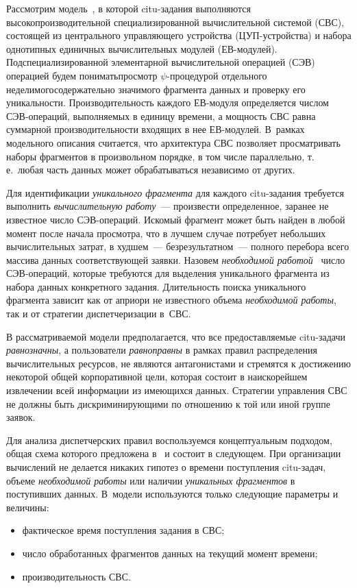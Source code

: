 \begin{multicols}{2}
Рассмотрим модель~\cite{Inf1-13}, в которой citu-за\-да\-ния выполняются
высокопроизводительной специализированной вы\-чис\-ли\-тель\-ной сис\-те\-мой
(СВС),  со\-сто\-ящей из центрального управляющего устрой\-ст\-ва
(ЦУП-устрой\-ст\-ва) и набора однотипных  единичных вычислительных
модулей (ЕВ-модулей). Под\linebreak специализированной элементарной
вычислительной операцией (СЭВ) опе\-ра\-ци\-ей будем понимать\linebreak просмотр
$\psi$-про\-це\-ду\-рой отдельного неделимого\linebreak содержательно значимого
фрагмента данных и проверку  его уникальности.  Производительность
каж\-до\-го ЕВ-мо\-ду\-ля  определяется числом СЭВ-опе\-ра\-ций, выполняемых в
единицу времени, а мощ\-ность СВС равна суммарной производительности
входящих в нее ЕВ-мо\-ду\-лей. В~рамках модельного описания считается,
что архитектура СВС позволяет просматривать наборы фрагментов в
произвольном порядке, в том числе параллельно, т.\,е.\ любая часть
данных может обрабатываться независимо от других.

Для идентификации \textit{уникального фрагмента} для каждого
citu-за\-да\-ния требуется выполнить  \textit{вычислительную работу}~---
произвести определенное, заранее не известное число СЭВ-опе\-ра\-ций.
Искомый фрагмент может быть найден в любой момент после начала
просмотра, что в лучшем случае потребует небольших вычислительных
затрат, в худшем~--- безрезультатном~---  полного перебора всего
массива данных соответствующей заявки. Назовем \textit{необходимой
работой}~\cite{Prep1-13} число СЭВ-опе\-ра\-ций, которые требуются  для
выделения уникального фрагмента из набора данных конкретного
задания. Длительность  поиска уникального фрагмента зависит как от
априори не известного объема \textit{необходимой работы}, так и  от
стратегии  диспетчеризации в~СВС.

В рассматриваемой модели предполагается, что все предоставляемые
citu-за\-да\-чи \textit{равнозначны}, а пользователи
\textit{равноправны} в рамках правил распределения вычислительных
ресурсов, не являются антагонистами и стремятся к достижению
некоторой общей корпоративной цели, которая состоит в  наискорейшем
извлечении всей информации из имеющихся данных. Стратегии управления
СВС не должны быть дискриминирующими по отношению к той или иной
группе заявок.

Для анализа диспетчерских правил воспользуемся концептуальным
подходом, общая схема которого предложена в~\cite{Inf1-13, Prep1-13}
и состоит в следующем. При  организации вычислений не делается
никаких гипотез о времени поступления citu-за\-дач, объеме
\textit{необходимой работы} или наличии \textit{уникальных фрагментов} в
поступивших данных. В~модели используются только следующие параметры
и величины:
\begin{itemize}
\item фактическое время поступления задания в СВС;
\item  число обработанных фрагментов данных на текущий момент времени;
\item  производительность СВС. 
\end{itemize}


\end{multicols}
